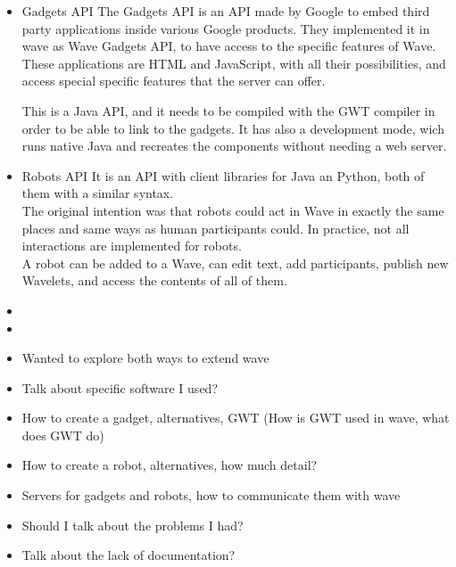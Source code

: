 \begin{itemize}
  \item Gadgets API
  The Gadgets API is an API made by Google to embed third party applications inside various Google products. They implemented it in wave as Wave Gadgets API, to have access to the specific features of Wave. These applications are HTML and JavaScript, with all their possibilities, and access special specific features that the server can offer.

This is a Java API, and it needs to be compiled with the GWT compiler in order to be able to link to the gadgets. It has also a development mode, wich runs native Java and recreates the components without needing a web server.

  \item Robots API
  It is an API with client libraries for Java an Python, both of them with a similar syntax.\\
  The original intention was that robots could act in Wave in exactly the same places and same ways as human participants could. In practice, not all interactions are implemented for robots.\\
  A robot can be added to a Wave, can edit text, add participants, publish new Wavelets, and access the contents of all of them.
\end {itemize}

\begin{itemize}
\item {}
\item {}
  \item Wanted to explore both ways to extend wave
  \item Talk about specific software I used?
  \item How to create a gadget, alternatives, GWT (How is GWT used in wave, what does GWT do)
  \item How to create a robot, alternatives, how much detail?
  \item Servers for gadgets and robots, how to communicate them with wave
  \item Should I talk about the problems I had?
  \item Talk about the lack of documentation?
\end{itemize}
